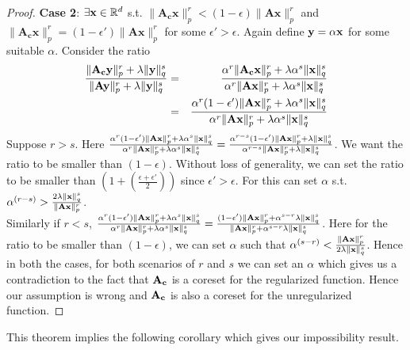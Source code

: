 \begin{proof}
	 \textbf{Case 2}: $\exists  \mathbf{x} \in \mathbb{R}^{d}$ s.t. $\|\mathbf{A_cx}\|_p^r < (1-\epsilon) \|\mathbf{Ax}\|_p^r$ and $\|\mathbf{A_cx}\|_p^r = (1-\epsilon')\|\mathbf{Ax}\|_p^r$ for some $\epsilon' > \epsilon$.
    Again define $\mathbf{y}=\alpha\mathbf{x}$ for some suitable $\alpha$. Consider the ratio
	\begin{eqnarray*}
	\frac{\|\mathbf{A_cy}\|_p^r + \lambda \|\mathbf{y}\|_q^s}{\|\mathbf{Ay}\|_p^r + \lambda \|\mathbf{y}\|_q^s} &=& \frac{\alpha^r \|\mathbf{A_cx}\|_p^r + \lambda\alpha^s \|\mathbf{x}\|_q^s}{\alpha^r \|\mathbf{Ax}\|_p^r + \lambda\alpha^s \|\mathbf{x}\|_q^s}\\
	&=&\frac{\alpha^r(1-\epsilon')\|\mathbf{Ax}\|_p^r + \lambda\alpha^s \|\mathbf{x}\|_q^s}{\alpha^r \|\mathbf{Ax}\|_p^r + \lambda\alpha^s \|\mathbf{x}\|_q^s}
	\end{eqnarray*}
	Suppose $r>s$. Here $\frac{\alpha^r(1-\epsilon')\|\mathbf{Ax}\|_p^r + \lambda\alpha^s \|\mathbf{x}\|_q^s}{\alpha^r \|\mathbf{Ax}\|_p^r + \lambda\alpha^s \|\mathbf{x}\|_q^s}  = \frac{\alpha^{r-s}(1-\epsilon')\|\mathbf{Ax}\|_p^r + \lambda \|\mathbf{x}\|_q^s}{\alpha^{r-s} \|\mathbf{Ax}\|_p^r + \lambda \|\mathbf{x}\|_q^s}$. We want the ratio to be smaller than $(1-\epsilon)$. Without loss of generality, we can set the ratio to be smaller than $(1+(\frac{\epsilon + \epsilon'}{2}))$ since $\epsilon' > \epsilon$. For this can set $\alpha$ s.t. $\alpha^{(r-s)} > \frac{2\lambda\|\mathbf{x}\|_q^s}{\|\mathbf{Ax}\|_p^r} $.\\
	 Similarly if $r<s$, $\frac{\alpha^r(1-\epsilon')\|\mathbf{Ax}\|_p^r + \lambda\alpha^s \|\mathbf{x}\|_q^s}{\alpha^r \|\mathbf{Ax}\|_p^r + \lambda\alpha^s \|\mathbf{x}\|_q^s}  = \frac{(1-\epsilon')\|\mathbf{Ax}\|_p^r + \alpha^{s-r} \lambda \|\mathbf{x}\|_q^s}{ \|\mathbf{Ax}\|_p^r + \alpha^{s-r}\lambda \|\mathbf{x}\|_q^s}$. Here for the ratio to be smaller than $(1-\epsilon)$, we can set $\alpha$ such that $\alpha^{(s-r)} < \frac{\|\mathbf{Ax}\|_p^r}{2\lambda\|\mathbf{x}\|_q^s}$. Hence in both the cases, for both scenarios of $r$ and $s$ we can set an $\alpha$ which gives us a contradiction to the fact that $\mathbf{A_c}$ is a coreset for the regularized function. Hence our assumption is wrong and $\mathbf{A_c}$ is also a coreset for the unregularized function.
\end{proof}
This theorem implies the following corollary which gives our impossibility result.
